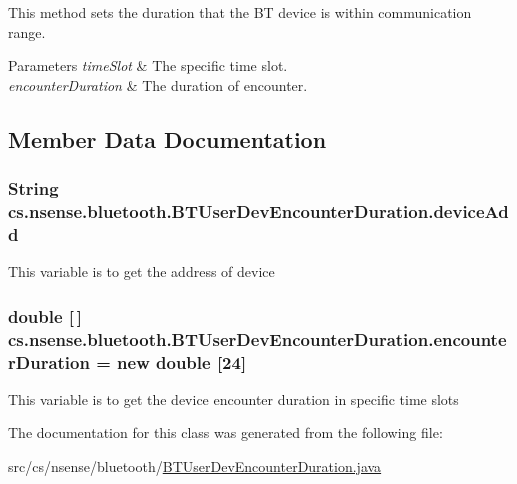 This method sets the duration that the B\-T device is within communication range. 
\begin{DoxyParams}{Parameters}
{\em time\-Slot} & The specific time slot. \\
\hline
{\em encounter\-Duration} & The duration of encounter. \\
\hline
\end{DoxyParams}


\subsection{Member Data Documentation}
\hypertarget{classcs_1_1nsense_1_1bluetooth_1_1_b_t_user_dev_encounter_duration_a72779f18fd8148cf5bcfe3bb9d8ed17a}{
\subsubsection[{device\-Add}]{\setlength{\rightskip}{0pt plus 5cm}String cs.\-nsense.\-bluetooth.\-B\-T\-User\-Dev\-Encounter\-Duration.\-device\-Add\hspace{0.3cm}{\ttfamily [private]}}}\label{classcs_1_1nsense_1_1bluetooth_1_1_b_t_user_dev_encounter_duration_a72779f18fd8148cf5bcfe3bb9d8ed17a}
This variable is to get the address of device \hypertarget{classcs_1_1nsense_1_1bluetooth_1_1_b_t_user_dev_encounter_duration_afeeaee6dc7ba949e1a8c40cbd71fea2e}{
\subsubsection[{encounter\-Duration}]{\setlength{\rightskip}{0pt plus 5cm}double \mbox{[}$\,$\mbox{]} cs.\-nsense.\-bluetooth.\-B\-T\-User\-Dev\-Encounter\-Duration.\-encounter\-Duration = new double \mbox{[}24\mbox{]}\hspace{0.3cm}{\ttfamily [private]}}}\label{classcs_1_1nsense_1_1bluetooth_1_1_b_t_user_dev_encounter_duration_afeeaee6dc7ba949e1a8c40cbd71fea2e}
This variable is to get the device encounter duration in specific time slots 

The documentation for this class was generated from the following file\-:\begin{DoxyCompactItemize}
\item 
src/cs/nsense/bluetooth/\hyperlink{_b_t_user_dev_encounter_duration_8java}{B\-T\-User\-Dev\-Encounter\-Duration.\-java}\end{DoxyCompactItemize}
